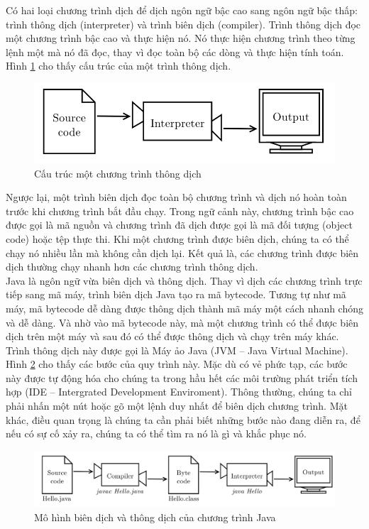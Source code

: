 \indent Có hai loại chương trình dịch để dịch ngôn ngữ bậc cao sang ngôn ngữ bậc thấp: trình thông dịch (interpreter) và trình biên dịch (compiler). Trình thông dịch đọc một chương trình bậc cao và thực hiện nó. Nó thực hiện chương trình theo từng lệnh một mà nó đã đọc, thay vì đọc toàn bộ các dòng và thực hiện tính toán. Hình \ref{hinh11} cho thấy cấu trúc của một trình thông dịch.
\begin{figure}[!ht]
\centering
\includegraphics[scale=0.5]{Figures//Hinh11.png}
\caption{Cấu trúc một chương trình thông dịch}\label{hinh11} 
\end{figure}

\indent Ngược lại, một trình biên dịch đọc toàn bộ chương trình và dịch nó hoàn toàn trước khi chương trình bắt đầu chạy. Trong ngữ cảnh này, chương trình bậc cao được gọi là mã nguồn và chương trình đã dịch được gọi là mã đối tượng (object code) hoặc tệp thực thi. Khi một chương trình được biên dịch, chúng ta có thể chạy nó nhiều lần mà không cần dịch lại. Kết quả là, các chương trình được biên dịch thường chạy nhanh hơn các chương trình thông dịch.\\
\indent Java là ngôn ngữ vừa biên dịch và thông dịch. Thay vì dịch các chương trình trực tiếp sang mã máy, trình biên dịch Java tạo ra mã bytecode. Tương tự như mã máy, mã bytecode dễ dàng được thông dịch thành mã máy một cách nhanh chóng và dễ dàng. Và nhờ vào mã bytecode này, mà một chương trình có thể được biên dịch trên một máy và sau đó có thể được thông dịch và chạy trên máy khác. Trình thông dịch này được gọi là Máy ảo Java (JVM – Java Virtual Machine).\\
\indent Hình \ref{hinh12} cho thấy các bước của quy trình này. Mặc dù có vẻ phức tạp, các bước này được tự động hóa cho chúng ta trong hầu hết các môi trường phát triển tích hợp (IDE – Intergrated Development Enviroment). Thông thường, chúng ta chỉ phải nhấn một nút hoặc gõ một lệnh duy nhất để biên dịch chương trình. Mặt khác, điều quan trọng là chúng ta cần phải biết những bước nào đang diễn ra, để nếu có sự cố xảy ra, chúng ta có thể tìm ra nó là gì và khắc phục nó.
\begin{figure}[!ht]
\centering
\includegraphics[scale=0.4]{Figures//Hinh12.png}
\caption{Mô hình biên dịch và thông dịch của chương trình Java}\label{hinh12} 
\end{figure}
